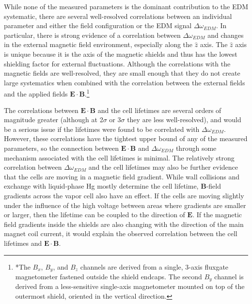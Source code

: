 \documentclass [10pt, twoside] {uwthesis}[2012/04/02]
\begin{document}
While none of the measured parameters is the dominant contribution to the EDM systematic, there are several well-resolved correlations between an individual parameter and either the field configuration or the EDM signal $\Delta\omega_{EDM}$. In particular, there is strong evidence of a correlation between $\Delta\omega_{EDM}$ and changes in the external magnetic field environment, especially along the $\hat{z}$ axis. The $\hat{z}$ axis is unique because it is the axis of the magnetic shields and thus has the lowest shielding factor for external fluctuations. Although the correlations with the magnetic fields are well-resolved, they are small enough that they do not create large systematics when combined with the correlation between the external fields and the applied fields $\mathbf{E}\cdot\mathbf{B}$.\footnote{*The $B_x$, $B_y$, and $B_z$ channels are derived from a single, 3-axis fluxgate magnetometer fastened outside the shield endcaps. The second $B_y$ channel  is derived from a less-sensitive single-axis magnetometer mounted on top of the outermost shield, oriented in the vertical direction.}

The correlations between $\mathbf{E}\cdot\mathbf{B}$ and the cell lifetimes are several orders of magnitude greater (although at 2$\sigma$ or 3$\sigma$ they are less well-resolved), and would be a serious issue if the lifetimes were found to be correlated with $\Delta\omega_{EDM}$. However, these correlations have the tightest upper bound of any of the measured parameters, so the connection between $\mathbf{E}\cdot\mathbf{B}$ and $\Delta\omega_{EDM}$ through some mechanism associated with the cell lifetimes is minimal. The relatively strong correlation between $\Delta\omega_{EDM}$ and the cell lifetimes may also be further evidence that the cells are moving in a magnetic field gradient. While wall collisions and exchange with liquid-phase Hg mostly determine the cell lifetime, $\mathbf{B}$-field gradients across the vapor cell also have an effect. If the cells are moving slightly under the influence of the high voltage between areas where gradients are smaller or larger, then the lifetime can be coupled to the direction of $\mathbf{E}$. If the magnetic field gradients inside the shields are also changing with the direction of the main magnet coil current, it would explain the observed correlation between the cell lifetimes and $\mathbf{E}\cdot\mathbf{B}$.
\end{document}
